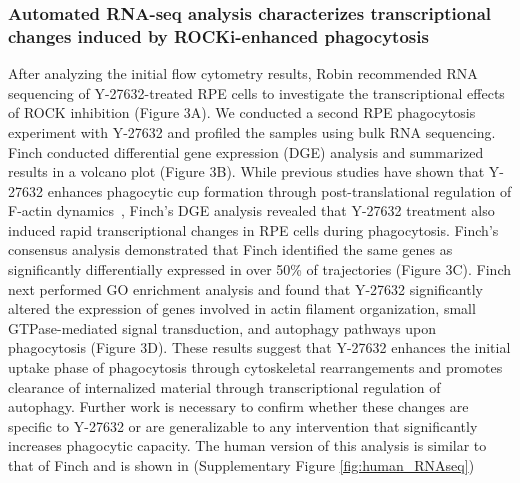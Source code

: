 \documentclass{article}
\begin{document}
\subsubsection{Automated RNA-seq analysis characterizes transcriptional changes induced by ROCKi-enhanced phagocytosis}

After analyzing the initial flow cytometry results, Robin recommended RNA sequencing of Y-27632-treated RPE cells to investigate the transcriptional effects of ROCK inhibition (Figure 3A). We conducted a second RPE phagocytosis experiment with Y-27632 and profiled the samples using bulk RNA sequencing. Finch conducted differential gene expression (DGE) analysis and summarized results in a volcano plot (Figure 3B). While previous studies have shown that Y-27632 enhances phagocytic cup formation through post-translational regulation of F-actin dynamics~\cite{Mao_Finnemann_2021, Halasz_Townes-Anderson_2016, Hollanders_VanBergen_Kindt_Castermans_Leysen_Vandewalle_Moons_Stalmans_2015, Kamao_Miki_Kiryu_2019, Maekawa_Ishizaki_Boku_Watanabe_Fujita_Iwamatsu_Obinata_Ohashi_Mizuno_Narumiya_1999}, Finch's DGE analysis revealed that Y-27632 treatment also induced rapid transcriptional changes in RPE cells during phagocytosis. Finch's consensus analysis demonstrated that Finch identified the same genes as significantly differentially expressed in over 50\% of trajectories (Figure 3C). Finch next performed GO enrichment analysis and found that Y-27632 significantly altered the expression of genes involved in actin filament organization, small GTPase-mediated signal transduction, and autophagy pathways upon phagocytosis (Figure 3D). These results suggest that Y-27632 enhances the initial uptake phase of phagocytosis through cytoskeletal rearrangements and promotes clearance of internalized material through transcriptional regulation of autophagy. Further work is necessary to confirm whether these changes are specific to Y-27632 or are generalizable to any intervention that significantly increases phagocytic capacity. The human version of this analysis is similar to that of Finch and is shown in (Supplementary Figure \ref{fig:human_RNAseq})
\end{document}

